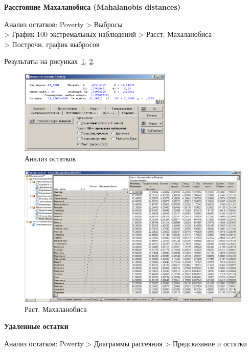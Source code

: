 \textbf{Расстояние Махаланобиса (Mahalanobis distances)}

Анализ остатков: Poverty > Выбросы\\
> График 100 экстремальных наблюдений > Расст. Махаланобиса\\
> Построчн. график выбросов

Результаты на рисунках~\ref{fig:example_31}, \ref{fig:example_32}.

\begin{figure}[!h]
  \centering

  \includegraphics[height=4cm]
  {inc/example_31.PNG}

  \caption{Анализ остатков}

  \label{fig:example_31}
\end{figure}

\begin{figure}[!h]
  \centering

  \includegraphics[width=13cm]
  {inc/example_32.PNG}

  \caption{Раст. Махаланобиса}

  \label{fig:example_32}
\end{figure}

\newpage

\textbf{Удаленные остатки}

Анализ остатков: Poverty > Диаграммы рассеяния >  Предсказание и остатки

